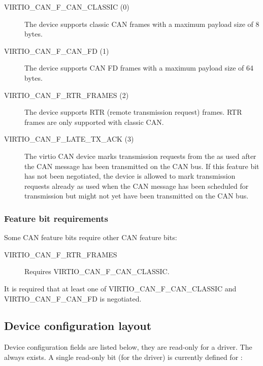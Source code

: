 \begin{description}

\item[VIRTIO_CAN_F_CAN_CLASSIC (0)]

The device supports classic CAN frames with a maximum payload size of 8
bytes.

\item[VIRTIO_CAN_F_CAN_FD (1)]

The device supports CAN FD frames with a maximum payload size of 64
bytes.

\item[VIRTIO_CAN_F_RTR_FRAMES (2)]

The device supports RTR (remote transmission request) frames. RTR frames
are only supported with classic CAN.

\item[VIRTIO_CAN_F_LATE_TX_ACK (3)]

The virtio CAN device marks transmission requests from the 
as used after the CAN message has been transmitted on the CAN bus. If
this feature bit has not been negotiated, the device is allowed to mark
transmission requests already as used when the CAN message has been
scheduled for transmission but might not yet have been transmitted on
the CAN bus.

\end{description}

\subsubsection{Feature bit requirements}\label{sec:Device Types / CAN Device / Feature bits / Feature bit requirements}

Some CAN feature bits require other CAN feature bits:
\begin{description}
\item[VIRTIO_CAN_F_RTR_FRAMES] Requires VIRTIO_CAN_F_CAN_CLASSIC.
\end{description}

It is required that at least one of VIRTIO_CAN_F_CAN_CLASSIC and
VIRTIO_CAN_F_CAN_FD is negotiated.

\subsection{Device configuration layout}\label{sec:Device Types / CAN Device / Device configuration layout} 

Device configuration fields are listed below, they are read-only for a
driver. The  always exists. A single read-only bit (for
the driver) is currently defined for :


